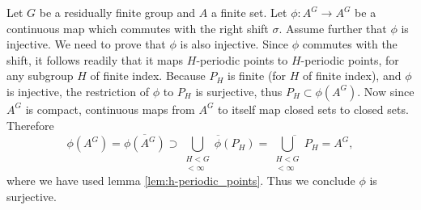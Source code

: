 Let $G$ be a residually finite group and $A$ a finite set. Let $\phi: A^G \to A^G$ be a continuous map which commutes with the right shift $\sigma$. Assume further that $\phi$ is injective. We need to prove that $\phi$ is also injective. Since $\phi$ commutes with the shift, it follows readily that it maps $H$-periodic points to $H$-periodic points, for any subgroup $H$ of finite index.
Because $P_H$ is finite (for $H$ of finite index), and $\phi$ is injective, the restriction of $\phi$ to $P_H$ is surjective, thus $P_H \subset \phi(A^G)$. Now since $A^G$ is compact, continuous maps from $A^G$ to itself map closed sets to closed sets. Therefore
\[
\phi(A^G) = \overline{\phi(A^G)} \supset
\overline{\bigcup_{\substack{H < G \\ [G : H] < \infty}}\phi( P_H)}
= \overline{\bigcup_{\substack{H < G \\ [G : H] < \infty}} P_H} = A^G,
\]
where we have used lemma \ref{lem:h-periodic_points}. Thus we conclude $\phi$ is surjective.